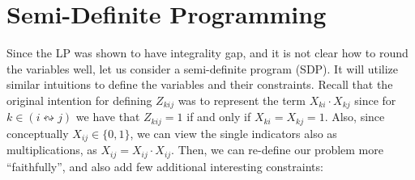 
\section{Semi-Definite Programming}
\label{section_Semidefinite_program}

Since the LP was shown to have integrality gap, and it is not clear how to round the variables well, let us consider a semi-definite program (SDP). It will utilize similar intuitions to define the variables and their constraints. Recall that the original intention for defining $Z_{kij}$ was to represent the term $X_{ki} \cdot X_{kj}$ since for $k \in (i \leftrightsquigarrow j)$ we have that $Z_{kij} = 1$ if and only if $X_{ki} = X_{kj} = 1$. Also, since conceptually $X_{ij} \in \{0,1\}$, we can view the single indicators also as multiplications, as $X_{ij} = X_{ij} \cdot X_{ij}$. Then, we can re-define our problem more ``faithfully'', and also add few additional interesting constraints:

